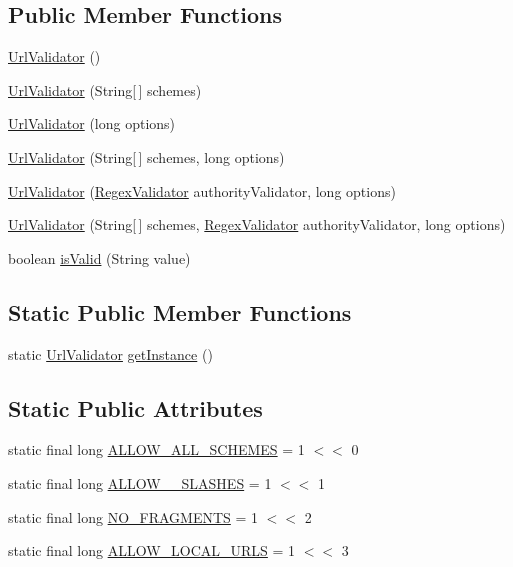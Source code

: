 \subsection*{Public Member Functions}
\begin{DoxyCompactItemize}
\item 
\hyperlink{classUrlValidator_aca1390e63674c0a23797c7cc06a30564}{Url\+Validator} ()
\item 
\hyperlink{classUrlValidator_acb49224c5b8936840f734120586ea09d}{Url\+Validator} (String\mbox{[}$\,$\mbox{]} schemes)
\item 
\hyperlink{classUrlValidator_ab4c272f9342b7a3e4b4184ee18a1d45e}{Url\+Validator} (long options)
\item 
\hyperlink{classUrlValidator_aaea06225017e4030284d1f487f530798}{Url\+Validator} (String\mbox{[}$\,$\mbox{]} schemes, long options)
\item 
\hyperlink{classUrlValidator_a4dcb6938b73df2c093739f03ac6ed52d}{Url\+Validator} (\hyperlink{classRegexValidator}{Regex\+Validator} authority\+Validator, long options)
\item 
\hyperlink{classUrlValidator_ae6e7b13ef1b296d2220239213c4c50b1}{Url\+Validator} (String\mbox{[}$\,$\mbox{]} schemes, \hyperlink{classRegexValidator}{Regex\+Validator} authority\+Validator, long options)
\item 
boolean \hyperlink{classUrlValidator_aad892796e16502238af06e5de73f1325}{is\+Valid} (String value)
\end{DoxyCompactItemize}
\subsection*{Static Public Member Functions}
\begin{DoxyCompactItemize}
\item 
static \hyperlink{classUrlValidator}{Url\+Validator} \hyperlink{classUrlValidator_aeb644e3bf40f37b798b450f15421bfad}{get\+Instance} ()
\end{DoxyCompactItemize}
\subsection*{Static Public Attributes}
\begin{DoxyCompactItemize}
\item 
static final long \hyperlink{classUrlValidator_a1cd6766c458c99db9d98b585417a9623}{A\+L\+L\+O\+W\+\_\+\+A\+L\+L\+\_\+\+S\+C\+H\+E\+M\+ES} = 1 $<$$<$ 0
\item 
static final long \hyperlink{classUrlValidator_a2a0966f94123825fcef6816a5d684ed2}{A\+L\+L\+O\+W\+\_\+\_\+\+S\+L\+A\+S\+H\+ES} = 1 $<$$<$ 1
\item 
static final long \hyperlink{classUrlValidator_a9f6b028f570818955c807cfe97e29641}{N\+O\+\_\+\+F\+R\+A\+G\+M\+E\+N\+TS} = 1 $<$$<$ 2
\item 
static final long \hyperlink{classUrlValidator_a8614b7832fddf98bff7ddfb5dfdbff75}{A\+L\+L\+O\+W\+\_\+\+L\+O\+C\+A\+L\+\_\+\+U\+R\+LS} = 1 $<$$<$ 3
\end{DoxyCompactItemize}
